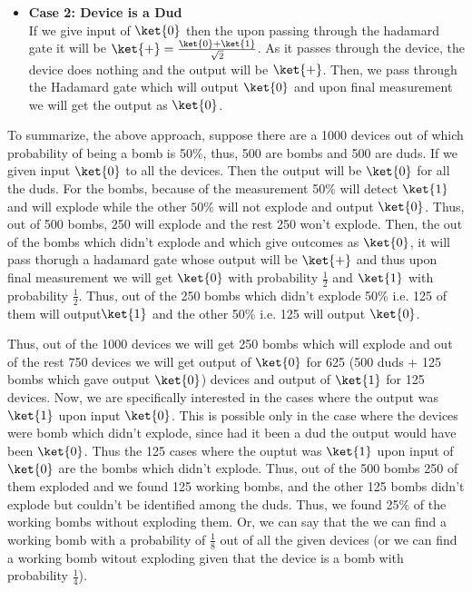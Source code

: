 \documentclass[12pt, oneside]{book}
\theoremstyle{definition}
\theoremstyle{definition}
\theoremstyle{remark}
\begin{document}
\begin{enumerate}
\begin{itemize}
        \item \textbf{Case 2: Device is a Dud}\\
        If we give input of $\ket{0}$ then the upon passing through the hadamard gate it will be $\ket{+}=\frac{\ket{0}+\ket{1}}{\sqrt{2}}$. As it passes through the device, the device does nothing and the output will be $\ket{+}$.
        Then, we pass through the Hadamard gate which will output $\ket{0}$ and upon final measurement we will get the output as $\ket{0}$.
    \end{itemize}
    To summarize, the above approach, suppose there are a 1000 devices out of which probability of being a bomb is 50\%, thus, 500 are bombs and 500 are duds. If we given input $\ket{0}$ to all the devices. Then the output will be $\ket{0}$ for all the duds. 
    For the bombs, because of the measurement 50\% will detect $\ket{1}$ and will explode while the other $50\%$ will not explode and output $\ket{0}$. Thus, out of 500 bombs, 250 will explode and the rest 250 won't explode. 
    Then, the out of the bombs which didn't explode and which give outcomes as $\ket{0}$, it will pass thorugh a hadamard gate whose output will be $\ket{+}$ and thus upon final measurement we will get $\ket{0}$ with probability $\frac{1}{2}$ and $\ket{1}$ with probability $\frac{1}{2}$.
    Thus, out of the 250 bombs which didn't explode 50\% i.e. 125 of them will output$\ket{1}$ and the other 50\% i.e. 125 will output $\ket{0}$. 

    Thus, out of the 1000 devices we will get 250 bombs which will explode and out of the rest 750 devices we will get output of $\ket{0}$ for 625 (500 duds + 125 bombs which gave output $\ket{0}$) devices and output of $\ket{1}$ for 125 devices. Now, we are specifically interested in the cases where the output was $\ket{1}$ upon input $\ket{0}$. This is possible
    only in the case where the devices were bomb which didn't explode, since had it been a dud the output would have been $\ket{0}$. Thus the 125 cases where the ouptut was $\ket{1}$ upon input of $\ket{0}$ are the bombs which didn't explode. 
    Thus, out of the 500 bombs 250 of them exploded and we found 125 working bombs, and the other 125 bombs didn't explode but couldn't be identified among the duds. Thus, we found 25\% of the working bombs without exploding them. Or, we can say that the we can find a working bomb with a probability of $\frac{1}{8}$ out of all the given devices (or we can find a working bomb witout exploding given that the device is a bomb with probability $\frac{1}{4}$).
    

\end{enumerate}
\end{document}
